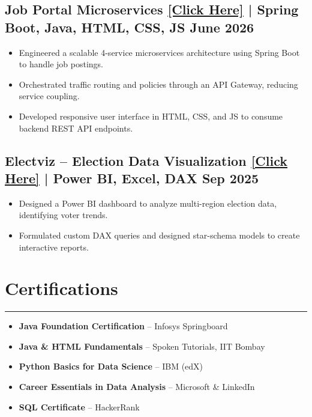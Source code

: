 \documentclass[9pt, a4paper]{extarticle}
\begin{document}
\subsection*{Job Portal Microservices \href{https://github.com/vishnu99617/job-portal-microservices}{\small\normalfont\underline{[Click Here]}} | Spring Boot, Java, HTML, CSS, JS \hfill June 2026}
\begin{itemize}
\item Engineered a scalable 4-service microservices architecture using Spring Boot to handle job postings.
\item Orchestrated traffic routing and policies through an API Gateway, reducing service coupling.
\item Developed responsive user interface in HTML, CSS, and JS to consume backend REST API endpoints.
\end{itemize}
\subsection*{Electviz -- Election Data Visualization \href{https://github.com/vishnu99617/Infosys_Springboard_Virtual_Internship_6.0_Batch-2_Team-E}{\small\normalfont\underline{[Click Here]}} | Power BI, Excel, DAX \hfill Sep 2025}
\begin{itemize}
\item Designed a Power BI dashboard to analyze multi-region election data, identifying voter trends.
\item Formulated custom DAX queries and designed star-schema models to create interactive reports.
\end{itemize}
\vspace{2pt}

\section*{Certifications}
\vspace{0pt}
\hrule
\vspace{2pt}
\begin{itemize}
  \item \textbf{Java Foundation Certification} -- Infosys Springboard
  \item \textbf{Java \& HTML Fundamentals} -- Spoken Tutorials, IIT Bombay
  \item \textbf{Python Basics for Data Science} -- IBM (edX)
  \item \textbf{Career Essentials in Data Analysis} -- Microsoft \& LinkedIn
  \item \textbf{SQL Certificate} -- HackerRank
\end{itemize}
\end{document}
